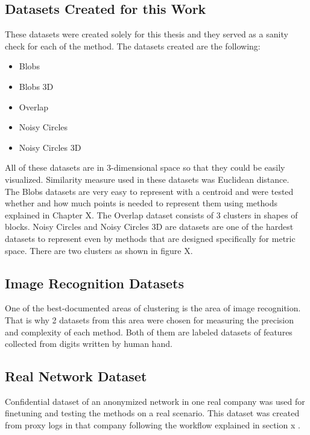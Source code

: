 \documentclass[thesis=B,english]{FITthesis}[2012/10/20]
\begin{document}
\subsection{Datasets Created for this Work}

These datasets were created solely for this thesis and they served as a sanity check for each of the method.
The datasets created are the following:
\begin{itemize}
    \item Blobs
    \item Blobs 3D
    \item Overlap
    \item Noisy Circles
    \item Noisy Circles 3D
\end{itemize}
All of these datasets are in 3-dimensional space so that they could be easily visualized. 
Similarity measure used in these datasets was Euclidean distance. \\

The Blobs datasets are very easy to represent with a centroid and were tested whether and how much points is needed to represent them using methods explained in Chapter X.  The Overlap dataset consists of 3 clusters in shapes of blocks. Noisy Circles and Noisy Circles 3D are datasets are one of the hardest datasets to represent even by methods that are designed specifically for metric space.
There are two clusters as shown in figure X. 

\subsection{Image Recognition Datasets}
One of the best-documented areas of clustering is the area of image recognition.
That is why 2 datasets from this area were chosen for measuring the precision and complexity of each method. Both of them are labeled datasets of features collected from digits written by human hand. \\


\subsection{Real Network Dataset}
Confidential dataset of an anonymized network in one real company was used for finetuning and testing the methods on a real scenario.
This dataset was created from proxy logs in that company following the workflow explained in section x . \\
                                                                                  
\end{document}
